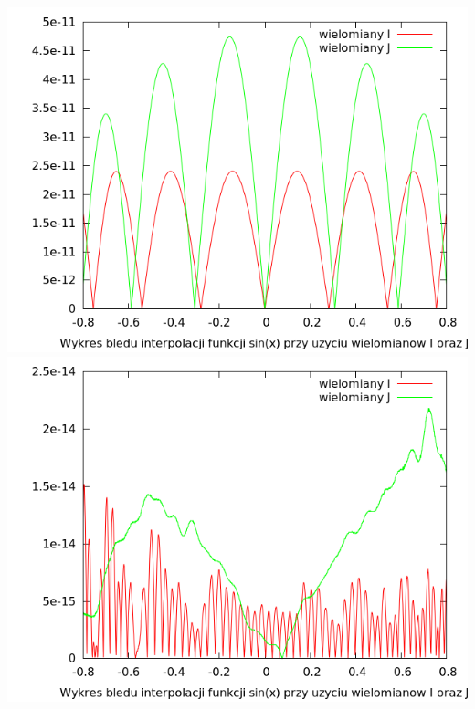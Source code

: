 \documentclass[11pt,leqno]{article}
\begin{document}
\begin{center}
\includegraphics[scale=0.55,natwidth=640,natheight=480]{plot/sin10e.png}\\
\includegraphics[scale=0.55,natwidth=640,natheight=480]{plot/sin100e.png}\\
\end{center}
\end{document}
